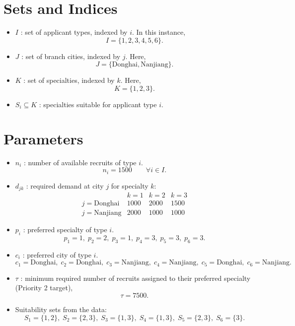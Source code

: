 \section*{Sets and Indices}

\begin{itemize}
    \item $I$ : set of applicant types, indexed by $i$. In this instance,
    \[
    I=\{1,2,3,4,5,6\}.
    \]
    \item $J$ : set of branch cities, indexed by $j$. Here,
    \[
    J=\{\text{Donghai},\text{Nanjiang}\}.
    \]
    \item $K$ : set of specialties, indexed by $k$. Here,
    \[
    K=\{1,2,3\}.
    \]
    \item $S_i \subseteq K$ : specialties suitable for applicant type $i$.
\end{itemize}

\section*{Parameters}

\begin{itemize}
    \item $n_i$ : number of available recruits of type $i$.
    \[
    n_i = 1500 \qquad \forall i\in I.
    \]
    \item $d_{jk}$ : required demand at city $j$ for specialty $k$:
    \[
    \begin{array}{c|ccc}
    & k=1 & k=2 & k=3\\ \hline
    j=\text{Donghai} & 1000 & 2000 & 1500\\
    j=\text{Nanjiang} & 2000 & 1000 & 1000
    \end{array}
    \]
    \item $p_i$ : preferred specialty of type $i$.
    \[
    p_1=1,\; p_2=2,\; p_3=1,\; p_4=3,\; p_5=3,\; p_6=3.
    \]
    \item $c_i$ : preferred city of type $i$.
    \[
    c_1=\text{Donghai},\;
    c_2=\text{Donghai},\;
    c_3=\text{Nanjiang},\;
    c_4=\text{Nanjiang},\;
    c_5=\text{Donghai},\;
    c_6=\text{Nanjiang}.
    \]
    \item $\tau$ : minimum required number of recruits assigned to their preferred specialty (Priority 2 target),
    \[
    \tau = 7500.
    \]
    \item Suitability sets from the data:
    \[
    S_1=\{1,2\},\;
    S_2=\{2,3\},\;
    S_3=\{1,3\},\;
    S_4=\{1,3\},\;
    S_5=\{2,3\},\;
    S_6=\{3\}.
    \]
\end{itemize}

